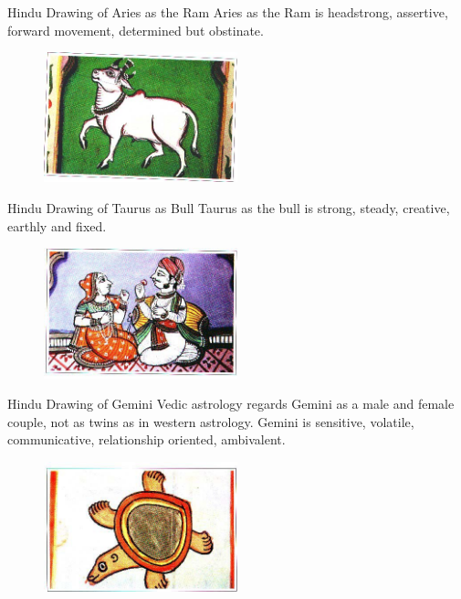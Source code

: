 Hindu Drawing of Aries as the Ram
Aries as the Ram is headstrong, assertive, forward movement, determined but obstinate.


 \begin{figure}[H]
 \centering
\includegraphics[width=0.5\textwidth]{pics/Taurus.png}
 \end{figure}

Hindu Drawing of Taurus as Bull
Taurus as the bull is strong, steady, creative, earthly and fixed.



 \begin{figure}[H]
 \centering
\includegraphics[width=0.5\textwidth]{pics/Gemini.png}
 \end{figure}

Hindu Drawing of Gemini
Vedic astrology regards Gemini as a male and female couple, not as twins as in western astrology.
Gemini is sensitive, volatile, communicative, relationship oriented, ambivalent.

 

\begin{figure}[H]
 \centering
\includegraphics[width=0.5\textwidth]{pics/Cancer.png}
 \end{figure}

